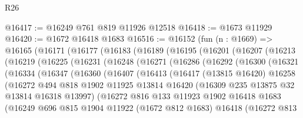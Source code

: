 \begin{lexlean}{R26}
\begin{coremodule}
@16417 := @16249 @761 @819 @11926 @12518
@16418 := @1673 @11929
@16420 := @1672 @16418 @1683
@16516 := @16152
    (fun (n : @1669) =>
    @16165
      (@16171
        (@16177
          (@16183
            (@16189
              (@16195
                (@16201
                  (@16207
                    (@16213
                      (@16219
                        (@16225
                          (@16231
                            (@16248
                              (@16271
                                (@16286
                                  (@16292
                                    (@16300
                                      (@16321
                                        (@16334
                                          (@16347
                                            (@16360
                                              (@16407
                                                (@16413
                                                  (@16417
                                                    (@13815 @16420)
                                                    @16258
                                                    (@16272
                                                      @494
                                                      @818
                                                      @1902
                                                      @11925
                                                      @13814
                                                      @16420
                                                      (@16309 @235 @13875 @32 @13814 @16318 @13997)
                                                      (@16272
                                                        @816
                                                        @133
                                                        @11923
                                                        @1902
                                                        @16418
                                                        @1683
                                                        (@16249
                                                          @696
                                                          @815
                                                          @1904
                                                          @11922
                                                          (@1672 @812 @1683)
                                                          @16418
                                                          (@16272
                                                            @813

\end{coremodule}
\end{lexlean}
